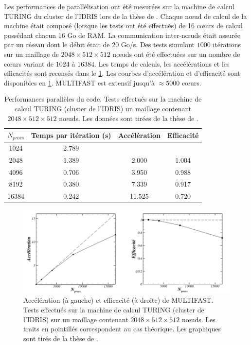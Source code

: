 Les performances de parallélisation ont été mesurées sur la machine de calcul TURING du cluster de l'IDRIS lors de la thèse de \cite{Bauer_PhDThesis}. Chaque nœud de calcul de la machine était composé (lorsque les tests ont été effectués) de 16 cœurs de calcul possédant chacun 16 Go de RAM. La communication inter-nœuds était assurée par un réseau dont le débit était de 20 Go/s. Des tests simulant $1000$ itérations sur un maillage de $2048 \times 512 \times 512$ nœuds ont été effectuées sur un nombre de cœurs variant de $1024$ à $16384$. Les temps de calculs, les accélérations et les efficacités sont recensés dans le \cref{tab/perfo_MULTIFAST}. Les courbes d'accélération et d'efficacité sont disponibles en \cref{fig/perfo_MULTIFAST}. MULTIFAST est extensif jusqu'à $\approx 5000$ cœurs.

\begin{table}[!hbtp]
\centering
\begin{tabular}{|c||c|c|c|}
\hline
\textbf{$N_{procs}$} & \textbf{Temps par itération (s)} & \textbf{Accélération} & \textbf{Efficacité}\\ \hline
1024 & 2.789 & & \\
2048 & 1.389 & 2.000 & 1.004 \\
4096 & 0.706 & 3.950 & 0.988 \\
8192 & 0.380 & 7.339 & 0.917 \\
16384 & 0.242 & 11.525 & 0.720 \\ \hline
\end{tabular}
\caption{Performances parallèles du code. Tests effectués sur la machine de calcul TURING (cluster de l'IDRIS) un maillage contenant $2048 \times 512 \times 512$ nœuds. Les données sont tirées de la thèse de \cite{Bauer2015}.}
\label{tab/perfo_MULTIFAST}
\end{table}

\begin{figure}[!hbtp]
    \centering
    \includegraphics[width=\linewidth]{Chap2/Pictures/Parallelisation/perfo_MULTIFAST.png}
    \caption{Accélération (à gauche) et efficacité (à droite) de MULTIFAST. Tests effectués sur la machine de calcul TURING (cluster de l'IDRIS) sur un maillage contenant $2048 \times 512 \times 512$ nœuds. Les traits en pointillés correspondent au cas théorique. Les graphiques sont tirés de la thèse de \cite{Bauer2015}.}
    \label{fig/perfo_MULTIFAST}
\end{figure}

